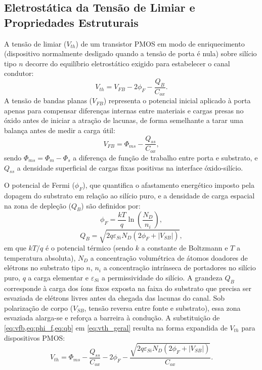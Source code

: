 \subsection{Eletrostática da Tensão de Limiar e Propriedades Estruturais}
\label{subsec:eletrostatica_vth_estruturais}

A tensão de limiar ($V_{th}$) de um transistor PMOS em modo de enriquecimento (dispositivo normalmente desligado quando a tensão de porta é nula) sobre silício tipo $n$ decorre do equilíbrio eletrostático exigido para estabelecer o canal condutor:
\begin{equation}
\label{eq:vth_geral}
V_{th} = V_{FB} - 2\phi_F - \frac{Q_B}{C_{ox}}.
\end{equation}
A tensão de bandas planas ($V_{FB}$) representa o potencial inicial aplicado à porta apenas para compensar diferenças internas entre materiais e cargas presas no óxido antes de iniciar a atração de lacunas, de forma semelhante a tarar uma balança antes de medir a carga útil:
\begin{equation}
\label{eq:vfb}
V_{FB} = \Phi_{ms} - \frac{Q_{ss}}{C_{ox}},
\end{equation}
sendo $\Phi_{ms} = \Phi_m - \Phi_s$ a diferença de função de trabalho entre porta e substrato, e $Q_{ss}$ a densidade superficial de cargas fixas positivas na interface óxido-silício.

O potencial de Fermi ($\phi_F$), que quantifica o afastamento energético imposto pela dopagem do substrato em relação ao silício puro, e a densidade de carga espacial na zona de depleção ($Q_B$) são definidos por:
\begin{equation}
\label{eq:phi_f}
\phi_F = \frac{k T}{q} \ln\left(\frac{N_D}{n_i}\right),
\end{equation}
\begin{equation}
\label{eq:qb}
Q_B = \sqrt{2 q \varepsilon_{Si} N_D (2\phi_F + |V_{SB}|)},
\end{equation}
em que $kT/q$ é o potencial térmico (sendo $k$ a constante de Boltzmann e $T$ a temperatura absoluta), $N_D$ a concentração volumétrica de átomos doadores de elétrons no substrato tipo $n$, $n_i$ a concentração intrínseca de portadores no silício puro, $q$ a carga elementar e $\varepsilon_{Si}$ a permissividade do silício. A grandeza $Q_B$ corresponde à carga dos íons fixos exposta na faixa do substrato que precisa ser esvaziada de elétrons livres antes da chegada das lacunas do canal. Sob polarização de corpo ($V_{SB}$, tensão reversa entre fonte e substrato), essa zona esvaziada alarga-se e reforça a barreira à condução. A substituição de \cref{eq:vfb,eq:phi_f,eq:qb} em \cref{eq:vth_geral} resulta na forma expandida de $V_{th}$ para dispositivos PMOS:
\begin{equation}
\label{eq:vth_expandido}
V_{th} = \Phi_{ms} - \frac{Q_{ss}}{C_{ox}} - 2\phi_F - \frac{\sqrt{2 q \varepsilon_{Si} N_D (2\phi_F + |V_{SB}|)}}{C_{ox}}.
\end{equation}

